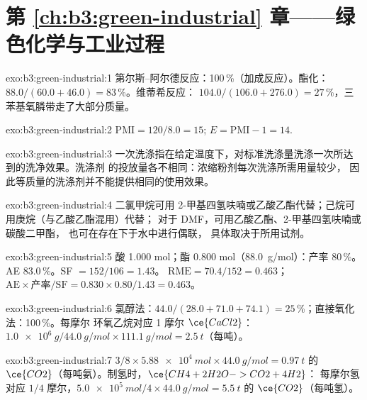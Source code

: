 \section*{第 \ref{ch:b3:green-industrial} 章——绿色化学与工业过程}

\begin{solution}{exo:b3:green-industrial:1}
第尔斯–阿尔德反应：100\,\%（加成反应）。酯化：$88.0/(60.0 + 46.0) = 83$\,\%。维蒂希反应：
$104.0/(106.0 + 276.0) = 27$\,\%，三苯基氧膦带走了大部分质量。
\end{solution}

\begin{solution}{exo:b3:green-industrial:2}
$\mathrm{PMI} = 120/8.0 = 15$; $E = \mathrm{PMI} - 1 = 14$.
\end{solution}

\begin{solution}{exo:b3:green-industrial:3}
一次洗涤指在给定温度下，对标准洗涤量洗涤一次所达到的洗净效果。洗涤剂
的投放量各不相同：浓缩粉剂每次洗涤所需用量较少，
因此等质量的洗涤剂并不能提供相同的使用效果。
\end{solution}

\begin{solution}{exo:b3:green-industrial:4}
二氯甲烷可用 2-甲基四氢呋喃或乙酸乙酯代替；己烷可用庚烷（与乙酸乙酯混用）代替；
对于 DMF，可用乙酸乙酯、2-甲基四氢呋喃或碳酸二甲酯，
也可在存在下于水中进行偶联，
具体取决于所用试剂。
\end{solution}

\begin{solution}{exo:b3:green-industrial:5}
酸 1.000 mol；酯 0.800 mol（\qty{88.0}{g/mol}）：产率 80\,\%。AE 83.0\,\%。SF $= 152/106 = 1.43$。
$\mathrm{RME} = 70.4/152 = 0.463$；$\mathrm{AE} \times \text{产率}/\mathrm{SF} = 0.830 \times 0.80/1.43 = 0.463$。
\end{solution}

\begin{solution}{exo:b3:green-industrial:6}
氯醇法：$44.0/(28.0 + 71.0 + 74.1) = 25$\,\%；直接氧化法：100\,\%。每摩尔
环氧乙烷对应 1 摩尔 $\ce{CaCl2}$：$\qty{1.0e6}{g}/\qty{44.0}{g/mol} \times \qty{111.1}{g/mol} = \qty{2.5}{t}$（每吨）。
\end{solution}

\begin{solution}{exo:b3:green-industrial:7}
$3/8 \times \qty{5.88e4}{mol} \times \qty{44.0}{g/mol} = \qty{0.97}{t}$ 的 $\ce{CO2}$（每吨氨）。制氢时，$\ce{CH4 + 2H2O -> CO2 + 4H2}$：
每摩尔氢对应 $1/4$ 摩尔，$\qty{5.0e5}{mol}/4 \times \qty{44.0}{g/mol} = \qty{5.5}{t}$ 的 $\ce{CO2}$（每吨氢）。
\end{solution}

